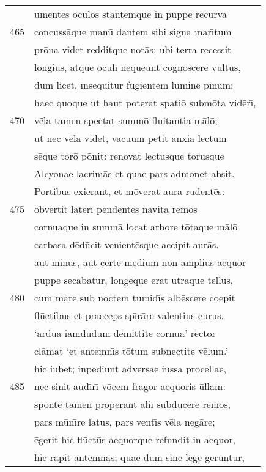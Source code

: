 \documentclass[paper=6in:9in,pagesize=pdftex,
               headinclude=on,footinclude=on,12pt]{scrbook}
\begin{document}
\begin{longtable}[p]{ r l }
 & \=ument\=es ocul\=os stantemque in puppe recurv\=a\\ 
465 & concuss\=aque man\=u dantem sibi signa mar\={\i}tum\\ 
 & pr\=ona videt redditque not\=as; ubi terra recessit\\ 
 & longius, atque ocul\={\i} nequeunt cogn\=oscere vult\=us,\\ 
 & dum licet, \={\i}nsequitur fugientem l\=umine p\={\i}num;\\ 
 & haec quoque ut haut poterat spati\=o subm\=ota vid\=er\={\i},\\ 
470 & v\=ela tamen spectat summ\=o fluitantia m\=al\=o;\\ 
 & ut nec v\=ela videt, vacuum petit \=anxia lectum\\ 
 & s\=eque tor\=o p\=onit: renovat lectusque torusque\\ 
 & Alcyonae lacrim\=as et quae pars admonet absit.\\ 
 & \indent Portibus exierant, et m\=overat aura rudent\=es:\\ 
475 & obvertit later\={\i} pendent\=es n\=avita r\=em\=os\\ 
 & cornuaque in summ\=a locat arbore t\=otaque m\=al\=o\\ 
 & carbasa d\=ed\=ucit venient\=esque accipit aur\=as.\\ 
 & aut minus, aut cert\=e medium n\=on amplius aequor\\ 
 & puppe sec\=ab\=atur, long\=eque erat utraque tell\=us,\\ 
480 & cum mare sub noctem tumid\={\i}s alb\=escere coepit\\ 
 & fl\=uctibus et praeceps sp\={\i}r\=are valentius eurus.\\ 
 & `ardua iamd\=udum d\=emittite cornua' r\=ector\\ 
 & cl\=amat `et antemn\={\i}s t\=otum subnectite v\=elum.'\\ 
 & hic iubet; inpediunt adversae iussa procellae,\\ 
485 & nec sinit aud\={\i}r\={\i} v\=ocem fragor aequoris \=ullam:\\ 
 & sponte tamen properant ali\={\i} subd\=ucere r\=em\=os,\\ 
 & pars m\=un\={\i}re latus, pars vent\={\i}s v\=ela neg\=are;\\ 
 & \=egerit hic fl\=uct\=us aequorque refundit in aequor,\\ 
 & hic rapit antemn\=as; quae dum sine l\=ege geruntur,\\ 

\end{longtable}
\end{document}
